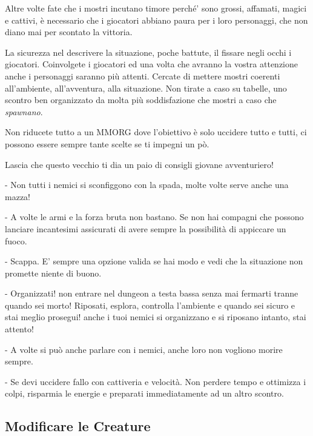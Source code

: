 \begin{multicols}{2}
	Altre volte fate che i mostri incutano timore perché' sono grossi, affamati, magici e cattivi, è necessario che i giocatori abbiano paura per i loro personaggi, che non diano mai per scontato la vittoria.

	La sicurezza nel descrivere la situazione, poche battute, il fissare negli occhi i giocatori. Coinvolgete i giocatori ed una volta che avranno la vostra attenzione anche i personaggi saranno più attenti. Cercate di mettere mostri coerenti all'ambiente, all'avventura, alla situazione. Non tirate a caso su tabelle, uno scontro ben organizzato da molta più soddisfazione che mostri a caso che \textit{spawnano}.

	Non riducete tutto a un MMORG dove l'obiettivo è solo uccidere tutto e tutti, ci possono essere sempre tante scelte se ti impegni un pò.

	\begin{changemargin}{0.3cm}{0.3cm}\begin{tcolorbox}[title = Affrontare i mostri]
			{
				Lascia che questo vecchio ti dia un paio di consigli giovane avventuriero!

				- Non tutti i nemici si sconfiggono con la spada, molte volte serve anche una mazza!

				- A volte le armi e la forza bruta non bastano. Se non hai compagni che possono lanciare incantesimi assicurati di avere sempre la possibilità di appiccare un fuoco.

				- Scappa. E' sempre una opzione valida se hai modo e vedi che la situazione non promette niente di buono.

				- Organizzati! non entrare nel dungeon a testa bassa senza mai fermarti tranne quando sei morto! Riposati, esplora, controlla l'ambiente e quando sei sicuro e stai meglio prosegui! anche i tuoi nemici si organizzano e si riposano intanto, stai attento!

				- A volte si può anche parlare con i nemici, anche loro non vogliono morire sempre.

				- Se devi uccidere fallo con cattiveria e velocità. Non perdere tempo e ottimizza i colpi, risparmia le energie e preparati immediatamente ad un altro scontro.

	}\end{tcolorbox}\end{changemargin}

	\subsection{Modificare le Creature}


\end{multicols}

